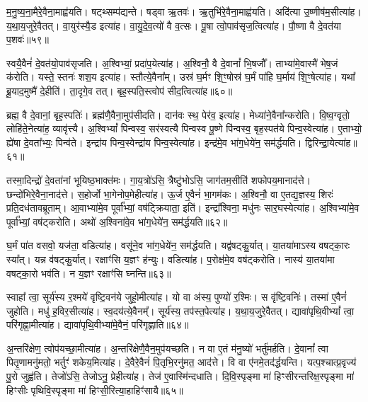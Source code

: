 म॒नु॒ष्य॒ना॒मैरे॒वैना॒माह्व॑यति। 
षट्थ्सम्प॑द्यन्ते। 
षड्वा ऋ॒तवः॑। 
ऋ॒तुभि॑रे॒वैना॒माह्व॑यति। 
अदि॑त्या उ॒ष्णीष॑म॒सीत्या॑ह। 
य॒था॒य॒जुरे॒वैतत्। 
वा॒युर॑स्यै॒ड इत्या॑ह। 
वा॒यु॒दे॒व॒त्यो॑ वै व॒त्सः। 
पू॒षा त्वो॒पाव॑सृज॒त्वित्या॑ह। 
पौ॒ष्णा वै दे॒वत॑या प॒शवः॑॥५९॥

स्वयै॒वैनं॑ दे॒वत॑यो॒पाव॑सृजति। 
अ॒श्विभ्यां॒ प्रदा॑प॒येत्या॑ह। 
अ॒श्विनौ॒ वै दे॒वानां᳚ भि॒षजौ᳚। 
ताभ्या॑मे॒वास्मै॑ भेष॒जं क॑रोति। 
यस्ते॒ स्तनः॑ शश॒य इत्या॑ह। 
स्तौत्ये॒वैना᳚म्। 
उस्र॑ घ॒र्मꣳ शि॒ꣳ॒षोस्र॑ घ॒र्मं पा॑हि घ॒र्माय॑ शि॒ꣳ॒षेत्या॑ह। 
यथा᳚ ब्रू॒याद॒मुष्मै॑ दे॒हीति॑। 
ता॒दृगे॒व तत्। 
बृह॒स्पति॒स्त्वोप॑ सीद॒त्वित्या॑ह॥६०॥

ब्रह्म॒ वै दे॒वानां॒ बृह॒स्पतिः॑। 
ब्रह्म॑णै॒वैना॒मुप॑सीदति। 
दान॑वः स्थ॒ पेर॑व॒ इत्या॑ह। 
मेध्या॑ने॒वैना᳚न्करोति। 
वि॒ष्व॒ग्वृतो॒ लोहि॑ते॒नेत्या॑ह॒ व्यावृ॑त्त्यै। 
अ॒श्विभ्यां᳚ पिन्वस्व॒ सर॑स्वत्यै पिन्वस्व पू॒ष्णे पि॑न्वस्व॒ बृह॒स्पत॑ये पिन्व॒स्वेत्या॑ह। 
ए॒ताभ्यो॒ ह्ये॑षा दे॒वता᳚भ्यः॒ पिन्व॑ते। 
इन्द्रा॑य पिन्व॒स्वेन्द्रा॑य पिन्व॒स्वेत्या॑ह। 
इन्द्र॑मे॒व भा॑ग॒धेये॑न॒ सम॑र्द्धयति। 
द्विरिन्द्रा॒येत्या॑ह॥६१॥

तस्मा॒दिन्द्रो॑ दे॒वता॑नां भूयिष्ठ॒भाक्त॑मः। 
गा॒य॒त्रो॑ऽसि॒ त्रैष्टु॑भोऽसि॒ जाग॑तम॒सीति॑ शफोपय॒मानाद॑त्ते। 
छन्दो॑भि\-रे॒वैना॒नाद॑त्ते। 
स॒होर्जो भा॒गेनोप॒मेहीत्या॑ह। 
ऊ॒र्ज ए॒वैनं॑ भा॒गम॑कः। 
अ॒श्विनौ॒ वा ए॒तद्य॒ज्ञस्य॒ शिरः॑ प्रति॒दध॑तावब्रूताम्। 
आ॒वाभ्या॑मे॒व पूर्वा᳚भ्यां॒ वष॑ट्क्रियाता॒ इति॑। 
इन्द्रा᳚श्विना॒ मधु॑नः सार॒घस्येत्या॑ह। 
अ॒श्विभ्या॑मे॒व पूर्वा᳚भ्यां॒ वष॑ट्करोति। 
अथो॑ अ॒श्विना॑वे॒व भा॑ग॒धेये॑न॒ सम॑र्द्धयति॥६२॥

घ॒र्मं पा॑त वसवो॒ यज॑ता॒ वडित्या॑ह। 
वसू॑ने॒व भा॑ग॒धेये॑न॒ सम॑र्द्धयति। 
यद्व॑षट्कु॒र्यात्। 
या॒तया॑माऽस्य वषट्का॒रः स्या᳚त्। 
यन्न व॑षट्कु॒र्यात्। 
रक्षाꣳ॑सि य॒ज्ञꣳ ह॑न्युः। 
वडित्या॑ह। 
प॒रोक्ष॑मे॒व वष॑ट्करोति। 
नास्य॑ या॒तया॑मा वषट्का॒रो भव॑ति। 
न य॒ज्ञꣳ रक्षाꣳ॑सि घ्नन्ति॥६३॥

स्वाहा᳚ त्वा॒ सूर्य॑स्य र॒श्मये॑ वृष्टि॒वन॑ये जुहो॒मीत्या॑ह। 
यो वा अ॑स्य॒ पुण्यो॑ र॒श्मिः। 
स वृ॑ष्टि॒वनिः॑। 
तस्मा॑ ए॒वैनं॑ जुहोति। 
मधु॑ ह॒विर॒सीत्या॑ह। 
स्व॒दय॑त्ये॒वैनम्᳚। 
सूर्य॑स्य॒ तप॑स्त॒पेत्या॑ह। 
य॒था॒य॒जुरे॒वैतत्। 
द्यावा॑पृथि॒वीभ्यां᳚ त्वा॒ परि॑गृह्णा॒मीत्या॑ह। 
द्यावा॑पृथि॒वीभ्या॑मे॒वैनं॒ परि॑गृह्णाति॥६४॥

अ॒न्तरि॑क्षेण॒ त्वोप॑यच्छा॒मीत्या॑ह। 
अ॒न्तरि॑क्षेणै॒वैन॒मुप॑यच्छति। 
न वा ए॒तं म॑नु॒ष्यो॑ भर्तु॑मर्\mbox{}हति। 
दे॒वानां᳚ त्वा पितृ॒णामनु॑मतो॒ भर्तुꣳ॑ शकेय॒मित्या॑ह। 
दे॒वैरे॒वैनं॑ पि॒तृभि॒रनु॑मत॒ आद॑त्ते। 
वि वा ए॑नमे॒तद॑र्द्धयन्ति। 
यत्प॒श्चात्प्र॒वृज्य॑ पु॒रो जुह्व॑ति। 
तेजो॑ऽसि॒ तेजोऽनु॒ प्रेहीत्या॑ह। 
तेज॑ ए॒वास्मि॑न्दधाति। 
दि॒वि॒स्पृङ्मा मा॑ हिꣳसीरन्तरिक्ष॒स्पृङ्मा मा॑ हिꣳसीः पृथिवि॒स्पृङ्मा मा॑ हिꣳसी॒रित्या॒हाहिꣳ॑सायै॥६५॥


